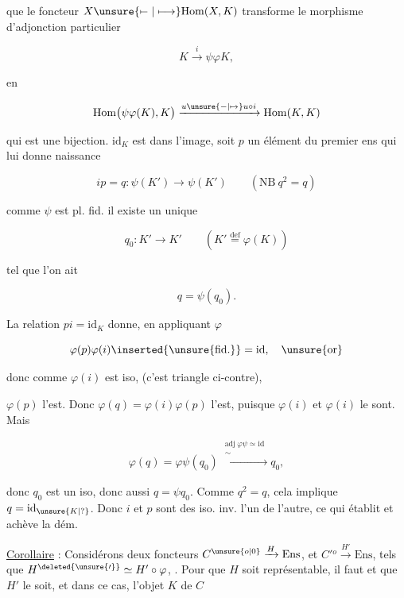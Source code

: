 
que le foncteur $X\unsure{\mapstochar\relbar|\longmapsto}\mathrm{Hom}(X,K)$ transforme le morphisme d'adjonction particulier 

\[
 K\xrightarrow{i}\psi\varphi K,
\]

en

\[
 \mathrm{Hom}\bigl(\psi\varphi(K),K\bigr)
 \xrightarrow{u\unsure{\relbar|\mapsto}u\circ i}\mathrm{Hom}(K,K)
\]

qui est une bijection.  $\mathrm{id}_K$ est dans l'image, soit $p$ un élément du premier ens qui lui donne naissance



\[
 ip=q:\psi(K')\longrightarrow\psi(K')\qquad(\mathrm{NB}\ q^2=q)
\]

comme $\psi$ est pl. fid. il existe un unique

\[
 q_0:K'\longrightarrow K'\qquad(K'\overset{\mathrm{def}}{=}\varphi(K))
\]

tel que l'on ait

\[
 q=\psi(q_0).
\]

La relation $pi=\mathrm{id}_K$ donne, en appliquant $\varphi$

\[
 \varphi(p)\varphi(i)\inserted{\unsure{\mathrm{fid.}}}=\mathrm{id},\quad\unsure{\text{or}}
\]

donc comme $\varphi(i)$ est iso, (c'est  triangle ci-contre),


$\varphi(p)$ l'est. Donc $\varphi(q)=\varphi(i)\varphi(p)$ l'est, puisque $\varphi(i)$ et $\varphi(i)$ le sont. Mais

\[
 \varphi(q)=\varphi\psi(q_0)\xrightarrow[\ ]{\substack{\mathrm{adj}\ \varphi\psi\simeq\mathrm{id}\\ \sim}}q_0,
\]

donc $q_0$ est un iso, donc aussi $q=\psi q_0$. Comme $q^2=q$, cela implique $q=\mathrm{id}_{\unsure{K|{?}}}$. Donc $i$ et $p$ sont des iso. inv. l'un de l'autre, ce qui établit  et achève la dém.

\uline{Corollaire} : Considérons deux foncteurs $C^{\unsure{o|0}}\xrightarrow{H}\mathrm{Ens}$, et $C'{}^o\xrightarrow{H'}\mathrm{Ens}$, tels que $H^{\deleted{\unsure{\prime}}}\simeq H'\circ\varphi$, . Pour que $H$ soit représentable, il faut et  que $H'$ le soit, et dans ce cas, l'objet $K$ de $C$

